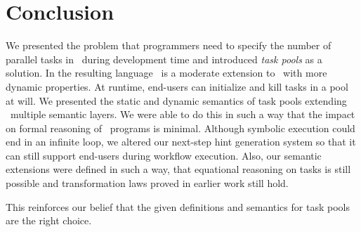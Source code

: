 
\section{Conclusion}
\label{sec:conclusion}

We presented the problem that programmers need to specify the number of parallel tasks in \TOPHAT\ during development time
and introduced \emph{task pools} as a solution.
In the resulting language \DYNTOPHAT\ is a moderate extension to \TOPHAT\ with more dynamic properties.
At runtime, end-users can initialize and kill tasks in a pool at will.
We presented the static and dynamic semantics of task pools extending \TOPHAT\ multiple semantic layers.
We were able to do this in such a way that the impact on formal reasoning of \TOPHAT\ programs is minimal.
Although symbolic execution could end in an infinite loop,
we altered our next-step hint generation system so that it can still support end-users during workflow execution.
Also, our semantic extensions were defined in such a way, that equational reasoning on tasks is still possible
and transformation laws proved in earlier work still hold.

This reinforces our belief that the given definitions and semantics for task pools are the right choice.
